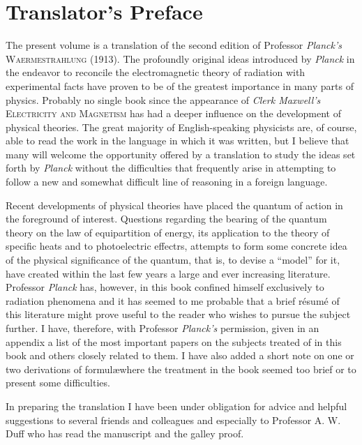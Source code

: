 \documentclass[12pt,oneside]{book}
\begin{document}

\chapter{Translator's Preface}
The present volume is a translation of the second edition of Professor \textit{Planck's} \textsc{Waermestrahlung} (1913). The profoundly original ideas introduced by \textit{Planck} in the endeavor to reconcile the electromagnetic theory of radiation with experimental facts have proven to be of the greatest importance in many parts of physics. Probably no single book since the appearance of \textit{Clerk Maxwell's} \textsc{Electricity and Magnetism} has had a deeper influence on the development of physical theories. The great majority of English-speaking physicists are, of course, able to read the work in the language in which it was written, but I believe that many will welcome the opportunity offered by a translation to study the ideas set forth by \textit{Planck} without the difficulties that frequently arise in attempting to follow a new and somewhat difficult line of reasoning in a foreign language. \par

Recent developments of physical theories have placed the quantum of action in the foreground of interest. Questions regarding the bearing of the quantum theory on the law of equipartition of energy, its application to the theory of specific heats and to photoelectric effectrs, attempts to form some concrete idea of the physical significance of the quantum, that is, to devise a ``model'' for it, have created within the last few years a large and ever increasing literature. Professor \textit{Planck} has, however, in this book confined himself exclusively to radiation phenomena and it has seemed to me probable that a brief r\'esum\'e of this literature might prove useful to the reader who wishes to pursue the subject further. I have, therefore, with Professor \textit{Planck's} permission, given in an appendix a list of the most important papers on the subjects treated of in this book and others closely related to them. I have also added a short note on one or two derivations of formul\ae where the treatment in the book seemed too brief or to present some difficulties. \par

In preparing the translation I have been under obligation for advice and helpful suggestions to several friends and colleagues and especially to Professor A. W. Duff who has read the manuscript and the galley proof. \par
\end{document}
